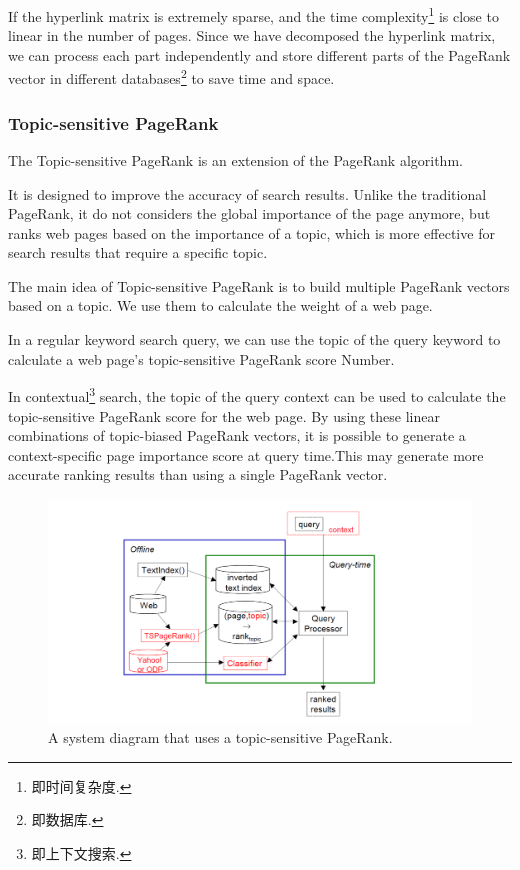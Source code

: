 \documentclass[lettersize,journal,12pt,conference]{IEEEtran}
\begin{document}
If the hyperlink matrix is extremely sparse, and the time complexity\footnote[2]{即时间复杂度.} is close to linear in the number of pages. Since we have decomposed the hyperlink matrix, we can process each part independently and store different parts of the PageRank vector in different databases\footnote[1]{即数据库.} to save time and space.

\subsubsection{Topic-sensitive PageRank}

The Topic-sensitive PageRank is an extension of the PageRank algorithm.

It is designed to improve the accuracy of search results. Unlike the traditional PageRank, it do not considers the global importance of the page anymore, but ranks web pages based on the importance of a topic, which is more effective for search results that require a specific topic.

The main idea of Topic-sensitive PageRank is to build multiple PageRank vectors based on a topic. We use them to calculate the weight of a web page. 

In a regular keyword search query, we can use the topic of the query keyword to calculate a web page's topic-sensitive PageRank score Number. 

In contextual\footnote[2]{即上下文搜索.} search, the topic of the query context can be used to calculate the topic-sensitive PageRank score for the web page. By using these linear combinations of topic-biased PageRank vectors, it is possible to generate a context-specific page importance score at query time.This may generate more accurate ranking results than using a single PageRank vector.

\begin{figure}[!t]
	\centering
	\includegraphics[width=\textwidth]{images/fig4.png}
	\caption{A system diagram that uses a topic-sensitive PageRank.}
	\label{fig5}
\end{figure}
\end{document}
